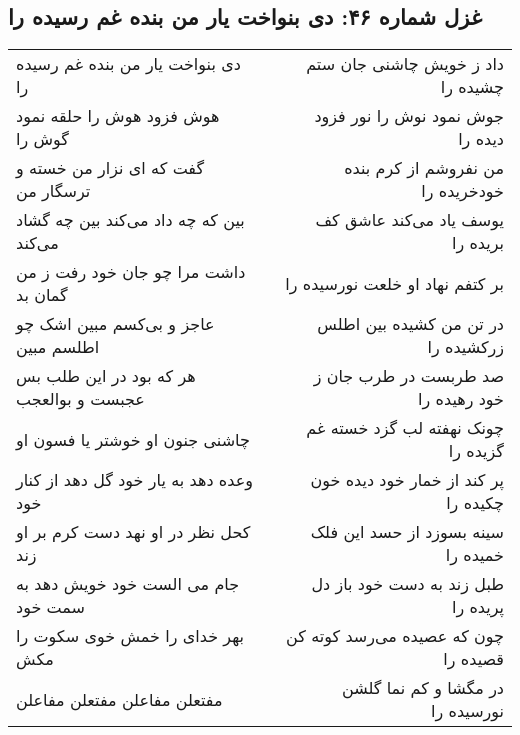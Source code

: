 \begin{center}
\section*{غزل شماره ۴۶: دی بنواخت یار من بنده غم رسیده را}
\label{sec:0046}
\begin{longtable}{l p{0.5cm} r}
دی بنواخت یار من بنده غم رسیده را
&&
داد ز خویش چاشنی جان ستم چشیده را
\\
هوش فزود هوش را حلقه نمود گوش را
&&
جوش نمود نوش را نور فزود دیده را
\\
گفت که ای نزار من خسته و ترسگار من
&&
من نفروشم از کرم بنده خودخریده را
\\
بین که چه داد می‌کند بین چه گشاد می‌کند
&&
یوسف یاد می‌کند عاشق کف بریده را
\\
داشت مرا چو جان خود رفت ز من گمان بد
&&
بر کتفم نهاد او خلعت نورسیده را
\\
عاجز و بی‌کسم مبین اشک چو اطلسم مبین
&&
در تن من کشیده بین اطلس زرکشیده را
\\
هر که بود در این طلب بس عجبست و بوالعجب
&&
صد طربست در طرب جان ز خود رهیده را
\\
چاشنی جنون او خوشتر یا فسون او
&&
چونک نهفته لب گزد خسته غم گزیده را
\\
وعده دهد به یار خود گل دهد از کنار خود
&&
پر کند از خمار خود دیده خون چکیده را
\\
کحل نظر در او نهد دست کرم بر او زند
&&
سینه بسوزد از حسد این فلک خمیده را
\\
جام می الست خود خویش دهد به سمت خود
&&
طبل زند به دست خود باز دل پریده را
\\
بهر خدای را خمش خوی سکوت را مکش
&&
چون که عصیده می‌رسد کوته کن قصیده را
\\
مفتعلن مفاعلن مفتعلن مفاعلن
&&
در مگشا و کم نما گلشن نورسیده را
\\
\end{longtable}
\end{center}
